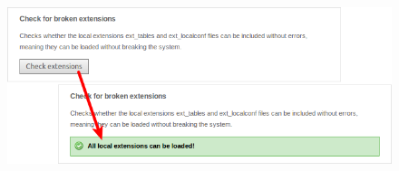 \begin{frame}[fragile]
\begin{columns}[T]
\begin{column}{.7\textwidth}
\begin{figure}
				\includegraphics[width=1\linewidth]{Images/InstallTool/CheckForBrokenExtensions.png}
			\end{figure}
		\end{column}
	\end{columns}

\end{frame}


